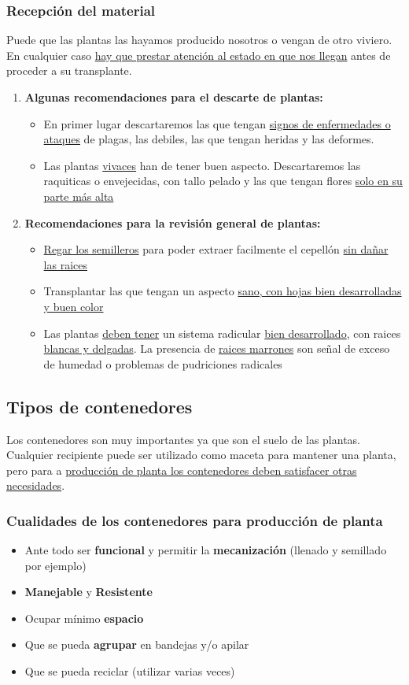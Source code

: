 \documentclass[a4paper,12pt,oneside]{article}
\begin{document}
\subsubsection{Recepción del material}
\label{sec:orgbbbf97e}
Puede que las plantas las hayamos producido nosotros o vengan de otro
viviero. En cualquier caso \uline{hay que prestar atención al estado en que nos
llegan} antes de proceder a su transplante.
\begin{enumerate}
\item \textbf{Algunas recomendaciones para el descarte de plantas:}
\begin{itemize}
\item En primer lugar descartaremos las que tengan \uline{signos de enfermedades o ataques}
de plagas, las debiles, las que tengan heridas y las deformes.
\item Las plantas \uline{vivaces} han de tener buen aspecto. Descartaremos las raquiticas
o envejecidas, con tallo pelado y las que tengan flores \uline{solo en su parte más
alta}
\end{itemize}
\item \textbf{Recomendaciones para la revisión general de plantas:}
\begin{itemize}
\item \uline{Regar los semilleros} para poder extraer facilmente el cepellón \uline{sin dañar
las raices}
\item Transplantar las que tengan un aspecto \uline{sano, con hojas bien desarrolladas
y buen color}
\item Las plantas \uline{deben tener} un sistema radicular \uline{bien desarrollado}, con
raices \uline{blancas y delgadas}. La presencia de \uline{raices marrones} son señal de
exceso de humedad o problemas de pudriciones radicales
\end{itemize}
\end{enumerate}
\subsection{Tipos de contenedores}
\label{sec:orgdd5396e}
Los contenedores son muy importantes ya que son el suelo de las
plantas. Cualquier recipiente puede ser utilizado como maceta para mantener una
planta, pero para a \uline{producción de planta los contenedores deben satisfacer
otras necesidades}.
\subsubsection{Cualidades de los contenedores para producción de planta}
\label{sec:org0dac310}
\begin{itemize}
\item Ante todo ser \textbf{funcional} y permitir la \textbf{mecanización} (llenado y semillado
por ejemplo)
\item \textbf{Manejable} y \textbf{Resistente}
\item Ocupar mínimo \textbf{espacio}
\item Que se pueda \textbf{agrupar} en bandejas y/o apilar
\item Que se pueda reciclar (utilizar varias veces)
\end{itemize}
\end{document}
